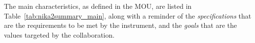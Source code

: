 The main characteristics, as defined in the MOU, are listed in
Table~\ref{tab:nika2summary_main}, along with a reminder of
the \emph{specifications} that are the requirements to be met by the
instrument, and the \emph{goals} that are the values targeted by the
collaboration.


